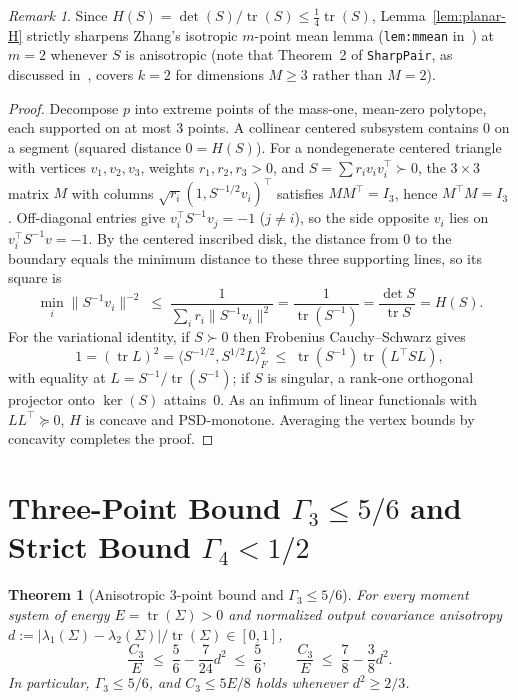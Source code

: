 \documentclass[11pt]{article}
\theoremstyle{plain}
\newtheorem{theorem}{Theorem}
\theoremstyle{definition}
\theoremstyle{remark}
\newtheorem{remark}{Remark}
\DeclareMathOperator{\tr}{tr}
\begin{document}
\begin{remark}
Since $H(S) = \det(S)/\tr(S) \le \frac{1}{4}\tr(S)$, Lemma~\ref{lem:planar-H} strictly sharpens Zhang's isotropic $m$-point mean lemma (\texttt{lem:mmean} in~\cite{Zhang2026}) at $m = 2$ whenever $S$ is anisotropic (note that Theorem~2 of \texttt{SharpPair}, as discussed in~\cite[\S 1]{Zhang2026}, covers $k=2$ for dimensions $M \ge 3$ rather than $M = 2$).
\end{remark}

\begin{proof}
Decompose $p$ into extreme points of the mass-one, mean-zero polytope, each supported on at most $3$ points.
A collinear centered subsystem contains $0$ on a segment (squared distance $0 = H(S)$).
For a nondegenerate centered triangle with vertices $v_1, v_2, v_3$, weights $r_1, r_2, r_3 > 0$, and $S = \sum r_i v_i v_i^\top \succ 0$, the $3 \times 3$ matrix $M$ with columns $\sqrt{r_i}(1, S^{-1/2}v_i)^\top$ satisfies $MM^\top = I_3$, hence $M^\top M = I_3$.
Off-diagonal entries give $v_i^\top S^{-1} v_j = -1$ ($j \neq i$), so the side opposite $v_i$ lies on $v_i^\top S^{-1} v = -1$.
By the centered inscribed disk, the distance from $0$ to the boundary equals the minimum distance to these three supporting lines, so its square is
\[
\min_i \|S^{-1}v_i\|^{-2}
\;\le\; \frac{1}{\sum_i r_i \|S^{-1}v_i\|^2}
= \frac{1}{\tr(S^{-1})} = \frac{\det S}{\tr S} = H(S).
\]
For the variational identity, if $S \succ 0$ then Frobenius Cauchy--Schwarz gives
\[
1 = (\tr L)^2 = \langle S^{-1/2}, S^{1/2}L\rangle_F^2 \;\le\; \tr(S^{-1})\tr(L^\top S L),
\]
with equality at $L = S^{-1}/\tr(S^{-1})$; if $S$ is singular, a rank-one orthogonal projector onto $\ker(S)$ attains~$0$.
As an infimum of linear functionals with $LL^\top \succeq 0$, $H$ is concave and PSD-monotone. Averaging the vertex bounds by concavity completes the proof.
\end{proof}

\section{Three-Point Bound \texorpdfstring{$\Gamma_3 \le 5/6$}{Gamma3 <= 5/6} and Strict Bound \texorpdfstring{$\Gamma_4 < 1/2$}{Gamma4 < 1/2}}

\begin{theorem}[Anisotropic 3-point bound and $\Gamma_3 \le 5/6$]\label{thm:five-sixth}
For every moment system of energy $E = \tr(\Sigma) > 0$ and normalized output covariance anisotropy $d := |\lambda_1(\Sigma) - \lambda_2(\Sigma)|/\tr(\Sigma) \in [0,1]$,
\[
\frac{C_3}{E} \;\le\; \frac{5}{6} - \frac{7}{24}d^2 \;\le\; \frac{5}{6}, \qquad
\frac{C_3}{E} \;\le\; \frac{7}{8} - \frac{3}{8}d^2.
\]
In particular, $\Gamma_3 \le 5/6$, and $C_3 \le 5E/8$ holds whenever $d^2 \ge 2/3$.
\end{theorem}
\end{document}
